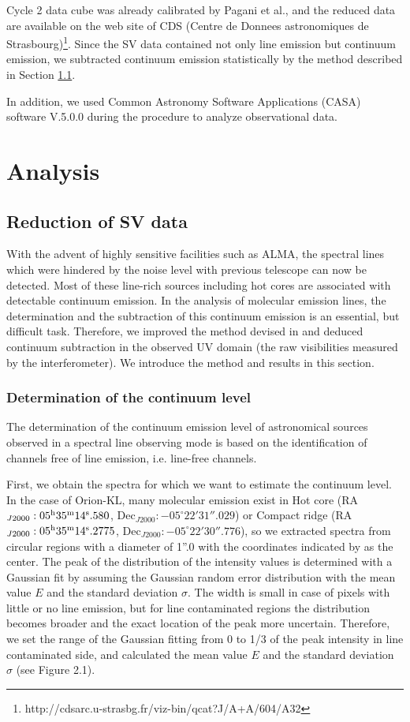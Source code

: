 Cycle 2 data cube was already calibrated by Pagani et al., and the reduced data are available on 
the web site of CDS (Centre de Donnees astronomiques de Strasbourg)\footnote{http://cdsarc.u-strasbg.fr/viz-bin/qcat?J/A+A/604/A32}.
Since the SV data contained not only line emission but continuum emission, 
we subtracted continuum emission statistically by the method described in Section \ref{sec:Statcont}.

In addition, we used Common Astronomy Software Applications (CASA) software V.5.0.0 \citep{McMullin+2007} during the procedure to analyze observational data.

\newpage
\section{Analysis}
\subsection{Reduction of SV data}
\label{sec:Statcont}

With the advent of highly sensitive facilities such as ALMA, the spectral lines which were hindered 
by the noise level with previous telescope can now be detected.
Most of these line-rich sources including hot cores are associated with detectable continuum emission.
In the analysis of molecular emission lines, the determination and the subtraction of this continuum 
emission is an essential, but difficult task. 
Therefore, we improved the method devised in \citet{Sanchez-Monge+2017} and deduced continuum subtraction 
in the observed UV domain (the raw visibilities measured by the interferometer).
We introduce the method and results in this section.

\subsubsection*{Determination of the continuum level}
The determination of the continuum emission level of astronomical sources observed in a spectral line 
observing mode is based on the identification of channels free of line emission, i.e. line-free channels.

First, we obtain the spectra for which we want to estimate the continuum level.  
In the case of Orion-KL, many molecular emission exist in Hot core
(RA$_{J2000}: 05^{\rm{h}}35^{\rm{m}}14^{\rm{s}}.580$, Dec$_{J2000}:-05^{\circ}22'31''.029$) or 
Compact ridge (RA$_{J2000}: 05^{\rm{h}}35^{\rm{m}}14^{\rm{s}}.2775$, Dec$_{J2000}:-05^{\circ}22'30''.776$), 
so we extracted spectra from circular regions with a diameter of 1''.0  with the coordinates indicated by 
\citet{Hirota+2015} as the center.
The peak of the distribution of the intensity values is determined with a Gaussian fit 
by assuming the Gaussian random error distribution with the mean value $E$ and the standard deviation $\sigma$.
The width is small in case of pixels with little or no line emission, but for line contaminated 
regions the distribution becomes broader and the exact location of the peak more uncertain. 
Therefore, we set the range of the Gaussian fitting from 0 to 1/3 of the peak intensity in line contaminated side,
and calculated the mean value $E$ and the standard deviation $\sigma$ (see Figure 2.1). 

